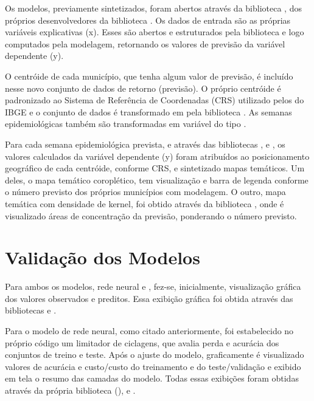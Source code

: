 \documentclass[
	12pt,				%
	openright,			%
	oneside,			%
	a4paper,			%
	english,			%
	french,				%
	spanish,			%
	brazil				%
	dvipsnames, table]{abntex2}
\begin{document}
\indent Os modelos, previamente sintetizados, foram abertos através da biblioteca , dos próprios desenvolvedores da biblioteca . Os dados de entrada são as próprias variáveis explicativas (x). Esses são abertos e estruturados pela biblioteca  e logo computados pela modelagem, retornando os valores de previsão da variável dependente (y).

\indent O centróide de cada município, que tenha algum valor de previsão, é incluído nesse novo conjunto de dados de retorno (previsão). O próprio centróide é padronizado ao Sistema de Referência de Coordenadas (\acrfull{CRS}) utilizado pelos  do \acrshort{IBGE} e o conjunto  de dados é transformado em  pela biblioteca . As semanas epidemiológicas também são transformadas em variável do tipo .

\indent Para cada semana epidemiológica prevista, e através das bibliotecas ,  e , os valores calculados da variável dependente (y) foram atribuídos ao posicionamento geográfico de cada centróide, conforme \acrshort{CRS}, e sintetizado mapas temáticos. Um deles, o mapa temático coroplético, tem visualização e barra de legenda conforme o número previsto dos próprios municípios com modelagem. O outro, mapa temática com densidade de kernel, foi obtido através da biblioteca , onde é visualizado áreas de concentração da previsão, ponderando o número previsto.

\section{Validação dos Modelos}

\indent Para ambos os modelos, rede neural e , fez-se, inicialmente, visualização gráfica dos valores observados e preditos. Essa exibição gráfica foi obtida através das bibliotecas  e .

\indent Para o modelo de rede neural, como citado anteriormente, foi estabelecido no próprio código um limitador de ciclagens, que avalia perda e acurácia dos conjuntos de treino e teste. Após o ajuste do modelo, graficamente é visualizado valores de acurácia e custo/custo do treinamento e do teste/validação e exibido em tela o resumo das camadas do modelo. Todas essas exibições foram obtidas através da própria biblioteca (),  e .
\end{document}
